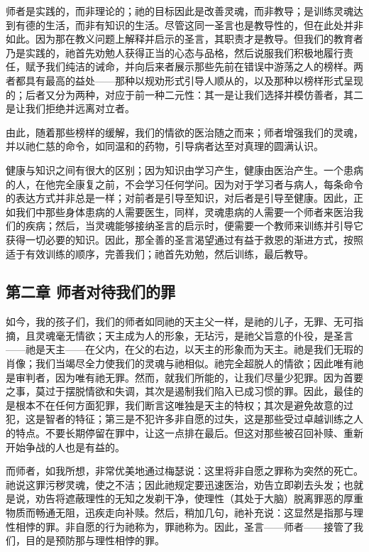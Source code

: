 师者是实践的，而非理论的；祂的目标因此是改善灵魂，而非教导；是训练灵魂达到有德的生活，而非有知识的生活。尽管这同一圣言也是教导性的，但在此处并非如此。因为那在教义问题上解释并启示的圣言，其职责才是教导。但我们的教育者乃是实践的，祂首先劝勉人获得正当的心态与品格，然后说服我们积极地履行责任，赋予我们纯洁的诫命，并向后来者展示那些先前在错误中游荡之人的榜样。两者都具有最高的益处——那种以规劝形式引导人顺从的，以及那种以榜样形式呈现的；后者又分为两种，对应于前一种二元性：其一是让我们选择并模仿善者，其二是让我们拒绝并远离对立者。\par

由此，随着那些榜样的缓解，我们的情欲的医治随之而来；师者增强我们的灵魂，并以祂仁慈的命令，如同温和的药物，引导病者达至对真理的圆满认识。\par

健康与知识之间有很大的区别；因为知识由学习产生，健康由医治产生。一个患病的人，在他完全康复之前，不会学习任何学问。因为对于学习者与病人，每条命令的表达方式并非总是一样；对前者是引导至知识，对后者是引导至健康。因此，正如我们中那些身体患病的人需要医生，同样，灵魂患病的人需要一个师者来医治我们的疾病；然后，当灵魂能够接纳圣言的启示时，便需要一个教师来训练并引导它获得一切必要的知识。因此，那全善的圣言渴望通过有益于救恩的渐进方式，按照适于有效训练的顺序，完善我们；祂首先劝勉，然后训练，最后教导。\par


\subsection{第二章 师者对待我们的罪}

如今，我的孩子们，我们的师者如同祂的天主父一样，是祂的儿子，无罪、无可指摘，且灵魂毫无情欲；天主成为人的形象，无玷污，是祂父旨意的仆役，是圣言——祂是天主——在父内，在父的右边，以天主的形象而为天主。祂是我们无瑕的肖像；我们当竭尽全力使我们的灵魂与祂相似。祂完全超脱人的情欲；因此唯有祂是审判者，因为唯有祂无罪。然而，就我们所能的，让我们尽量少犯罪。因为首要之事，莫过于摆脱情欲和失调，其次是遏制我们陷入已成习惯的罪。因此，最佳的是根本不在任何方面犯罪，我们断言这唯独是天主的特权；其次是避免故意的过犯，这是智者的特征；第三是不犯许多非自愿的过失，这是那些受过卓越训练之人的特点。不要长期停留在罪中，让这一点排在最后。但这对那些被召回补赎、重新开始争战的人也是有益的。\par

而师者，如我所想，非常优美地通过梅瑟说：这里将非自愿之罪称为突然的死亡。祂说这罪污秽灵魂，使之不洁；因此祂规定要迅速医治，劝告立即剃去头发；也就是说，劝告将遮蔽理性的无知之发剃干净，使理性（其处于大脑）脱离罪恶的厚重物质而畅通无阻，迅疾走向补赎。然后，稍加几句，祂补充说：这显然是指那与理性相悖的罪。非自愿的行为祂称为，罪祂称为。因此，圣言——师者——接管了我们，目的是预防那与理性相悖的罪。\par

